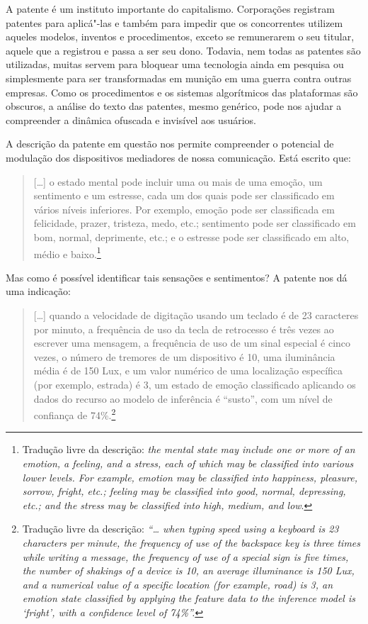 A patente é um instituto importante do capitalismo. Corporações
registram patentes para aplicá"-las e também para impedir que os
concorrentes utilizem aqueles modelos, inventos e procedimentos, exceto
se remunerarem o seu titular, aquele que a registrou e passa a ser seu
dono. Todavia, nem todas as patentes são utilizadas, muitas servem para
bloquear uma tecnologia ainda em pesquisa ou simplesmente para ser
transformadas em munição em uma guerra contra outras empresas. Como os
procedimentos e os sistemas algorítmicos das plataformas são obscuros, a
análise do texto das patentes, mesmo genérico, pode nos ajudar a
compreender a dinâmica ofuscada e invisível aos usuários.

A descrição da patente em questão nos permite compreender o potencial de
modulação dos dispositivos mediadores de nossa comunicação. Está escrito
que:

\begin{quote}
{[}\ldots{}{]} o estado mental pode incluir uma ou mais de uma emoção, um
sentimento e um estresse, cada um dos quais pode ser classificado em
vários níveis inferiores. Por exemplo, emoção pode ser classificada em
felicidade, prazer, tristeza, medo, etc.; sentimento pode ser
classificado em bom, normal, deprimente, etc.; e o estresse pode ser
classificado em alto, médio e baixo.\footnote{Tradução livre da
  descrição: \emph{the mental state may include one or more of an emotion, a
    feeling, and a stress, each of which may be classified into various
    lower levels. For example, emotion may be classified into happiness,
    pleasure, sorrow, fright, etc.; feeling may be classified into good,
    normal, depressing, etc.; and the stress may be classified into high,
    medium, and low}.}
\end{quote}

Mas como é possível identificar tais sensações e sentimentos? A patente
nos dá uma indicação:

\begin{quote}
{[}\ldots{}{]} quando a velocidade de digitação usando um teclado é de 23
caracteres por minuto, a frequência de uso da tecla de retrocesso é três
vezes ao escrever uma mensagem, a frequência de uso de um sinal especial
é cinco vezes, o número de tremores de um dispositivo é 10, uma
iluminância média é de 150 Lux, e um valor numérico de uma localização
específica (por exemplo, estrada) é 3, um estado de emoção classificado
aplicando os dados do recurso ao modelo de inferência é ``susto'', com
um nível de confiança de 74\%.\footnote{Tradução livre da descrição:
  \emph{``\ldots{} when typing speed using a keyboard is 23 characters per
    minute, the frequency of use of the backspace key is three times while
    writing a message, the frequency of use of a special sign is five
    times, the number of shakings of a device is 10, an average
    illuminance is 150 Lux, and a numerical value of a specific location
    (for example, road) is 3, an emotion state classified by applying the
    feature data to the inference model is `fright', with a confidence
    level of 74\%''.}} %
\end{quote}

